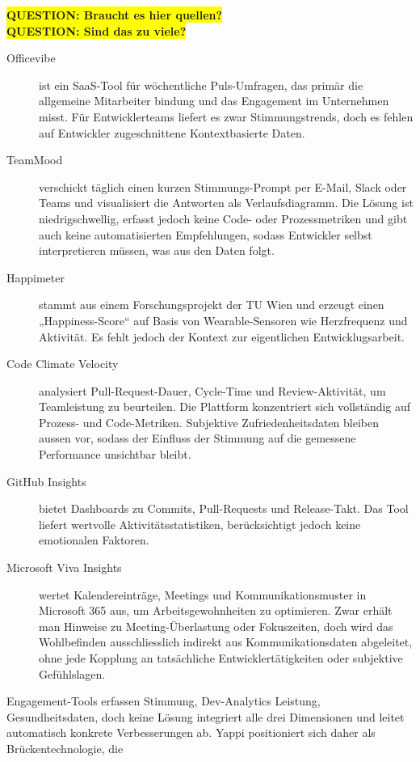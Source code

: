 \documentclass[12pt,a4paper]{report}
\newcommand{\question}[1]{\colorbox{yellow}{\textbf{QUESTION: #1}}\\}
\begin{document}
\question{Braucht es hier quellen?}
\question{Sind das zu viele?}
\begin{description}
	\item[Officevibe] ist ein SaaS-Tool für wöchentliche Puls-Umfragen, das primär die allgemeine Mitarbeiter­
		bindung und das Engagement im Unternehmen misst. Für Entwicklerteams liefert es zwar Stimmungs­trends,
		doch es fehlen auf Entwickler zugeschnittene Kontextbasierte Daten.

	\item[TeamMood] verschickt täglich einen kurzen Stimmungs-Prompt per E-Mail, Slack oder Teams und visualisiert
		die Antworten als Verlaufsdiagramm. Die Lösung ist niedrigschwellig, erfasst jedoch keine Code- oder 
		Prozessmetriken und gibt auch keine automatisierten Empfehlungen, sodass Entwickler selbst interpretieren 
		müssen, was aus den Daten folgt.

	\item[Happimeter] stammt aus einem Forschungsprojekt der TU Wien und erzeugt einen „Happiness-Score“ auf Basis 
		von Wearable-Sensoren wie Herzfrequenz und Aktivität. Es fehlt jedoch der Kontext zur eigentlichen 
		Entwicklugsarbeit.

	\item[Code Climate Velocity] analysiert Pull-Request-Dauer, Cycle-Time und Review-Aktivität, um Teamleistung zu
		beurteilen. Die Plattform konzentriert sich vollständig auf Prozess- und Code-Metriken. Subjektive
		Zufriedenheitsdaten bleiben aussen vor, sodass der Einfluss der Stimmung auf die gemessene Performance
		unsichtbar bleibt.

	\item[GitHub Insights] bietet Dashboards zu Commits, Pull-Requests und Release-Takt. Das Tool liefert wertvolle
		Aktivitäts­statistiken, berücksichtigt jedoch keine emotionalen Faktoren.

	\item[Microsoft Viva Insights] wertet Kalendereinträge, Meetings und Kommunikationsmuster in Microsoft 365 aus,
		um Arbeitsgewohnheiten zu optimieren. Zwar erhält man Hinweise zu Meeting-Überlastung oder Fokuszeiten,
		doch wird das Wohlbefinden ausschliesslich indirekt aus Kommunikationsdaten abgeleitet, ohne jede Kopplung 
		an tatsächliche Entwickler­tätigkeiten oder subjektive Gefühlslagen.
\end{description}

Engagement-Tools erfassen Stimmung, Dev-Analytics Leistung, Gesundheitsdaten, doch keine Lösung integriert alle drei
Dimensionen und leitet automatisch konkrete Verbesserungen ab. Yappi positioniert sich daher als Brückentechnologie, die
\end{document}
